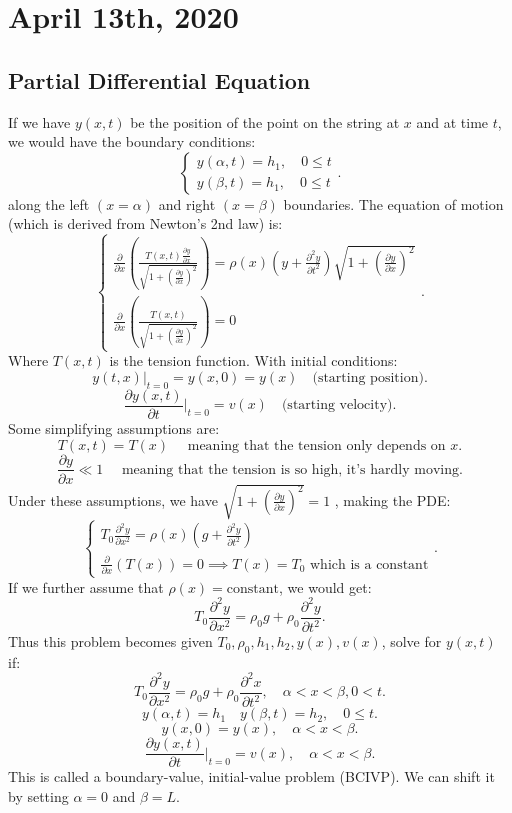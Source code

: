 \documentclass[../main/main.tex]{subfiles}
\begin{document}
\section{April 13th, 2020}
\subsection{Partial Differential Equation}
\begin{definition}
	If we have $y(x,t)$ be the position of the point on the string at $x$ and at time $t$, we would have the boundary conditions: \[
	\begin{cases}
		y(\alpha,t) = h_1, \quad 0 \le t \\
		y(\beta,t) = h_1, \quad 0 \le t 
	\end{cases}
	.\] along the left $(x = \alpha)$ and right $(x=\beta)$ boundaries. The equation of motion (which is derived from Newton's 2nd law) is: \[
\begin{cases}
	\frac{\partial }{\partial x} \left( \frac{T(x,t) \frac{\partial y}{\partial x} }{\sqrt{1+\left( \frac{\partial y}{\partial x}  \right) ^2} } \right) = \rho(x) \left( y+ \frac{\partial ^2 y}{\partial t^2}  \right) \sqrt{1+\left( \frac{\partial y}{\partial x}  \right) ^2} \\
\frac{\partial }{\partial x} \left( \frac{T(x,t)}{\sqrt{1+\left( \frac{\partial y}{\partial x}  \right) ^2} } \right) =0
\end{cases} 
.\] Where $T(x,t)$ is the tension function. With initial conditions: \[
y(t,x) \bigg\rvert_{t=0} = y(x,0) = y(x) \quad \text{(starting position)}
.\] \[
\frac{\partial y(x,t)}{\partial t} \bigg\rvert_{t=0}= v(x)\quad \text{(starting velocity)}
.\] Some simplifying assumptions are: \[
T(x,t) = T(x) \quad \text{ meaning that the tension only depends on $x$}
.\]  \[
\frac{\partial y}{\partial x}  \ll 1 \quad \text{ meaning that the tension is so high, it's hardly moving}
.\] 
Under these assumptions, we have $\sqrt{1+\left( \frac{\partial y}{\partial x}  \right) ^2}=1 $ , making the PDE: \[
\begin{cases}
	T_0 \frac{\partial ^2 y}{\partial x^2}  = \rho (x) \left( g + \frac{\partial ^2 y }{\partial t^2}  \right) \\
	\frac{\partial }{\partial x} \left( T(x) \right)  = 0 \implies T(x) = T_0 \text{ which is a constant}
\end{cases}
.\] If we further assume that $\rho(x)= \text{constant}$, we would get: \[
T_0 \frac{\partial ^2 y}{\partial x^2} = \rho_0 g + \rho_0 \frac{\partial ^2 y}{\partial t^2} 
.\] 
Thus this problem becomes given $T_0, \rho_0, h_1, h_2, y(x), v(x)$, solve for $y(x,t)$ if: \[
T_0 \frac{\partial ^2 y}{\partial x^2}  = \rho_0 g + \rho_0 \frac{\partial ^2 x}{\partial t^2} , \quad \alpha < x < \beta, 0 < t
.\] \[
y(\alpha,t) = h_1 \quad y(\beta,t) = h_2, \quad 0 \le  t
.\] \[
y(x,0) = y(x) , \quad \alpha < x < \beta
.\] \[
\frac{\partial y(x,t)}{\partial t} \bigg\rvert_{t=0} = v(x) , \quad \alpha < x < \beta
.\] This is called a boundary-value, initial-value problem (BCIVP). We can shift it by setting $\alpha = 0$ and $\beta = L$.
\end{definition}
\end{document}
